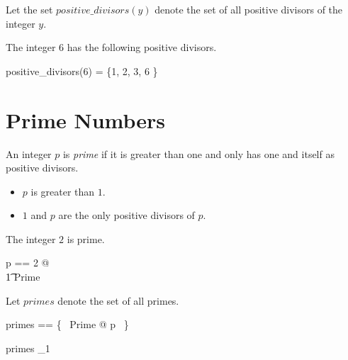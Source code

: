 \documentclass{amsart}
\begin{document}
Let the set $positive\_divisors(y)$ denote the set of all positive divisors of the integer $y$.


\begin{remark}
\end{remark}

\begin{example}
The integer $6$ has the following positive divisors.
\begin{zed}
	positive\_divisors(6) = \{1, 2, 3, 6 \}
\end{zed}
\end{example}

\section{Prime Numbers}

An integer $p$ is \textit{prime} if it is greater than one 
and only has one and itself as positive divisors.

\begin{itemize}
	\item $p$ is greater than $1$.
	\item $1$ and $p$ are the only positive divisors of $p$.
\end{itemize}

\begin{example}
The integer $2$ is prime.

\begin{zed}
	\LET p == 2 @ \\
	\t1	Prime
\end{zed}
\end{example}

Let $primes$ denote the set of all primes.

\begin{zed}
	primes == \{~ Prime @ p ~\}
\end{zed}

\begin{remark}
\begin{zed}
	primes \subset \nat_1
\end{zed}
\end{remark}
\end{document}
